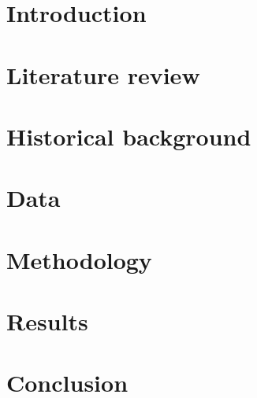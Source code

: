 
\section*{Introduction}



\newpage
\section{Literature review}


\newpage
\section{Historical background}



\newpage
\section{Data}


\newpage
\section{Methodology}


\newpage
\section{Results}


\newpage

\section*{Conclusion}



